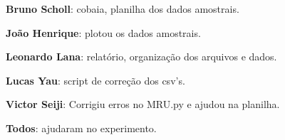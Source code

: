 \documentclass[a4paper, 12pt]{article}
\begin{document}
\textbf{Bruno Scholl}: cobaia, planilha dos dados amostrais.

\textbf{João Henrique}: plotou os dados amostrais.

\textbf{Leonardo Lana}: relatório, organização dos arquivos e dados.

\textbf{Lucas Yau}: script de correção dos csv's.

\textbf{Victor Seiji}: Corrigiu erros no MRU.py e ajudou na planilha.

\textbf{Todos}: ajudaram no experimento.
\end{document}
